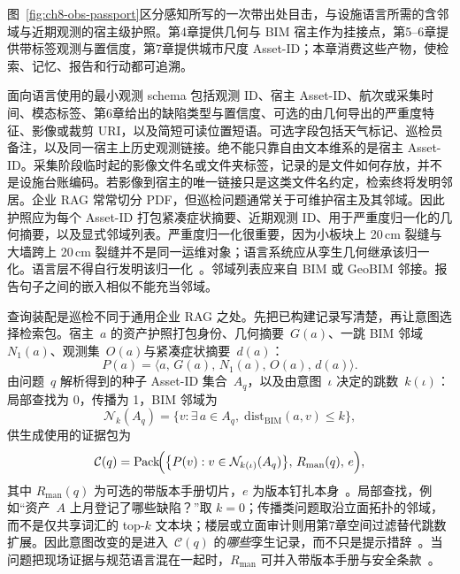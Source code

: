 图~\ref{fig:ch8-obs-passport}区分感知所写的一次带出处目击，与设施语言所需的含邻域与近期观测的宿主级护照。第4章提供几何与 BIM 宿主作为挂接点，第5--6章提供带标签观测与置信度，第7章提供城市尺度 Asset-ID；本章消费这些产物，使检索、记忆、报告和行动都可追溯。

面向语言使用的最小观测 schema 包括观测 ID、宿主 Asset-ID、航次或采集时间、模态标签、第6章给出的缺陷类型与置信度、可选的由几何导出的严重度特征、影像或裁剪 URI，以及简短可读位置短语。可选字段包括天气标记、巡检员备注，以及同一宿主上历史观测链接。绝不能只靠自由文本维系的是宿主 Asset-ID。采集阶段临时起的影像文件名或文件夹标签，记录的是文件如何存放，并不是设施台账编码。若影像到宿主的唯一链接只是这类文件名约定，检索终将发明邻居。企业 RAG 常常切分 PDF，但巡检问题通常关于可维护宿主及其邻域。因此护照应为每个 Asset-ID 打包紧凑症状摘要、近期观测 ID、用于严重度归一化的几何摘要，以及显式邻域列表。严重度归一化很重要，因为小板块上 20\,cm 裂缝与大墙跨上 20\,cm 裂缝并不是同一运维对象；语言系统应从孪生几何继承该归一化。语言层不得自行发明该归一化~\cite{zhao2026physical}。邻域列表应来自 BIM 或 GeoBIM 邻接。报告句子之间的嵌入相似不能充当邻域。

查询装配是巡检不同于通用企业 RAG 之处。先把已构建记录写清楚，再让意图选择检索包。宿主~$a$ 的资产护照打包身份、几何摘要~$G(a)$、一跳 BIM 邻域~$N_1(a)$、观测集~$O(a)$与紧凑症状摘要~$d(a)$：
\begin{equation}
\label{eq:ch8-passport}
P(a)=\bigl\langle a,\,G(a),\,N_1(a),\,O(a),\,d(a)\bigr\rangle.
\end{equation}
由问题~$q$ 解析得到的种子 Asset-ID 集合~$A_q$，以及由意图~$\iota$ 决定的跳数~$k(\iota)$：局部查找为 0，传播为 1，BIM 邻域为
\begin{equation}
\label{eq:ch8-khop}
\mathcal{N}_{k}(A_q)=\bigl\{v:\exists\,a\in A_q,\;\mathrm{dist}_{\mathrm{BIM}}(a,v)\le k\bigr\},
\end{equation}
供生成使用的证据包为
\begin{equation}
\label{eq:ch8-package}
\mathcal{C}(q)=\mathrm{Pack}\!\Bigl(\bigl\{P(v):v\in\mathcal{N}_{k(\iota)}(A_q)\bigr\},\,R_{\mathrm{man}}(q),\,e\Bigr),
\end{equation}
其中 $R_{\mathrm{man}}(q)$ 为可选的带版本手册切片，$e$ 为版本钉扎本身~\cite{lewis2020,peng2024,joffe2025buildingcodes}。局部查找，例如``资产~$A$ 上月登记了哪些缺陷？''取 $k=0$；传播类问题取沿立面拓扑的邻域，而不是仅共享词汇的 top-$k$ 文本块；楼层或立面审计则用第7章空间过滤替代跳数扩展。因此意图改变的是进入~$\mathcal{C}(q)$ 的\emph{哪些}孪生记录，而不只是提示措辞~\cite{lewis2020,peng2024}。当问题把现场证据与规范语言混在一起时，$R_{\mathrm{man}}$ 可并入带版本手册与安全条款~\cite{joffe2025buildingcodes,lee2024ragsafety,krutli2025fmrags}。

